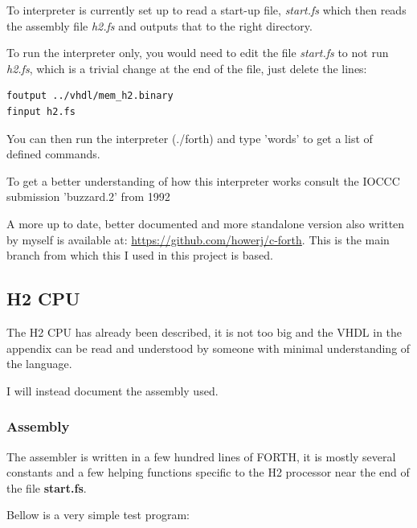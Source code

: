 \documentclass	[a4paper, 10pt]	{article}
\begin{document}
      To interpreter is currently set up to read a start-up file, \emph{start.fs}
      which then reads the assembly file \emph{h2.fs} and outputs that to the right
      directory.

      To run the interpreter only, you would need to edit the file \emph{start.fs}
      to not run \emph{h2.fs}, which is a trivial change at the end of the file,
      just delete the lines:

      \begin{verbatim}
foutput ../vhdl/mem_h2.binary
finput h2.fs
      \end{verbatim}     
       
      You can then run the interpreter (./forth) and type 'words' to get a list of
      defined commands.

      To get a better understanding of how this interpreter works consult the
      IOCCC submission 'buzzard.2' from 1992 \cite{ioccc}

      A more up to date, better documented and more standalone version also
      written by myself is available at: \url{https://github.com/howerj/c-forth}.
      This is the main branch from which this I used in this project is
      based.

    \subsection{H2 CPU}

    The H2 CPU has already been described, it is not too big and the VHDL in the
    appendix can be read and understood by someone with minimal understanding of
    the language.

    I will instead document the assembly used.

      \subsubsection{Assembly}

    The assembler is written in a few hundred lines of FORTH, it is mostly
    several constants and a few helping functions specific to the H2 processor
    near the end of the file \textbf{start.fs}.

    Bellow is a very simple test program:
\end{document}
